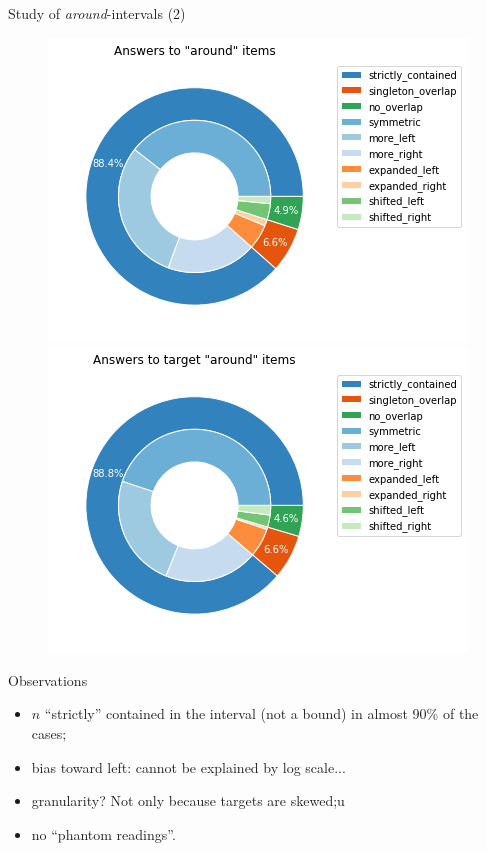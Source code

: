 \documentclass[xcolor=table, hyperref={pdfpagelabels=false}]{beamer}
\begin{document}
\begin{frame}{Study of \textit{around}-intervals (2)}
\begin{figure}
\includegraphics[width=.45\textwidth]{./images/around_items_int.png}
\includegraphics[width=.45\textwidth]{./images/target_around_items_int.png}
\end{figure}
\vspace{-5mm}
\begin{block}{Observations}
\begin{itemize}
	\item $n$ ``strictly'' contained in the interval (not a bound) in almost 90\% of the cases;
	\item bias toward left: cannot be explained by log scale...
	\item  granularity? Not only because targets are skewed;u
	\item no ``phantom readings''.
\end{itemize}
\end{block}
\end{frame}
\end{document}

